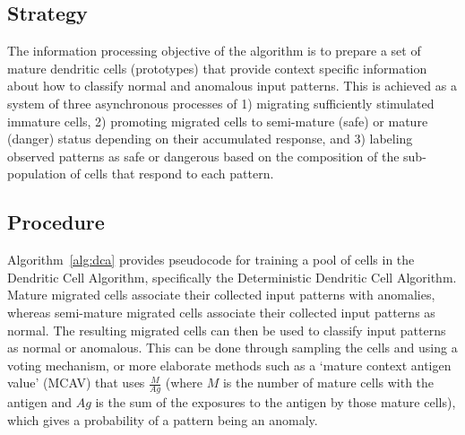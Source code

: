 \subsection{Strategy}
The information processing objective of the algorithm is to prepare a set of mature dendritic cells (prototypes) that provide context specific information about how to classify normal and anomalous input patterns.
This is achieved as a system of three asynchronous processes of 1) migrating sufficiently stimulated immature cells, 2) promoting migrated cells to semi-mature (safe) or mature (danger) status depending on their accumulated response, and 3) labeling observed patterns as safe or dangerous based on the composition of the sub-population of cells that respond to each pattern.

\subsection{Procedure}
Algorithm~\ref{alg:dca} provides pseudocode for training a pool of cells in the Dendritic Cell Algorithm, specifically the Deterministic Dendritic Cell Algorithm. Mature migrated cells associate their collected input patterns with anomalies, whereas semi-mature migrated cells associate their collected input patterns as normal.
The resulting migrated cells can then be used to classify input patterns as normal or anomalous. This can be done through sampling the cells and using a voting mechanism, or more elaborate methods such as a `mature context antigen value' (MCAV) that uses $\frac{M}{Ag}$ (where $M$ is the number of mature cells with the antigen and $Ag$ is the sum of the exposures to the antigen by those mature cells), which gives a probability of a pattern being an anomaly.

